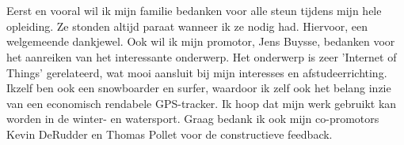 
\chapter*{}
\label{ch:voorwoord}
Eerst en vooral wil ik mijn familie bedanken voor alle steun tijdens mijn hele opleiding. Ze stonden altijd paraat wanneer ik ze nodig had. Hiervoor, een welgemeende dankjewel.
\newline
\newline
Ook wil ik mijn promotor, Jens Buysse, bedanken voor het aanreiken van het interessante onderwerp. Het onderwerp is zeer 'Internet of Things' gerelateerd, wat mooi aansluit bij mijn interesses en afstudeerrichting. Ikzelf ben ook een snowboarder en surfer, waardoor ik zelf ook het belang inzie van een economisch rendabele GPS-tracker. Ik hoop dat mijn werk gebruikt kan worden in de winter- en watersport.
\newline
\newline
Graag bedank ik ook mijn co-promotors Kevin DeRudder en Thomas Pollet voor de constructieve feedback. 